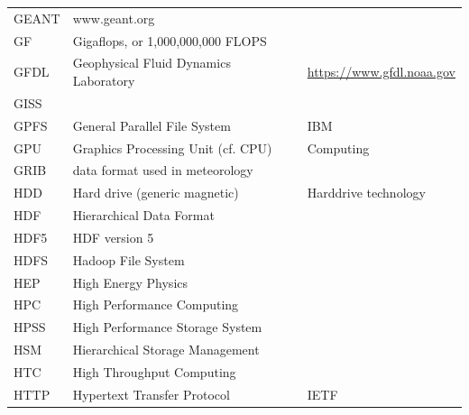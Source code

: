 \documentclass{../../template/esiwace-report}
\begin{document}
\begin{longtable}{|l|l|l|}
  GEANT       &       www.geant.org                                   &                                       \\
  GF          &         Gigaflops, or 1,000,000,000 FLOPS             &                                       \\
  GFDL        &  Geophysical Fluid Dynamics Laboratory   &  \url{https://www.gfdl.noaa.gov}                                  \\
  GISS        &                                                       &                                       \\
  GPFS        &         General Parallel File System                  &         IBM                           \\
  GPU         &         Graphics Processing Unit (cf. CPU)            &         Computing                     \\
  GRIB        &         data format used in meteorology               &                                       \\
  HDD         &         Hard drive (generic magnetic)                 &         Harddrive technology          \\
  HDF         &       Hierarchical Data Format                        &                                       \\
  HDF5        &       HDF version 5                                   &                                       \\
  HDFS        &       Hadoop File System                              &                                       \\
  HEP         &       High Energy Physics                             &                                       \\
  HPC         &       High Performance Computing                      &                                       \\
  HPSS        &         High Performance Storage System               &                                       \\
  HSM         &       Hierarchical Storage Management                 &                                       \\
  HTC         &       High Throughput Computing                       &                                       \\
  HTTP        &       Hypertext Transfer Protocol                     &       IETF                            \\

\end{longtable}
\end{document}
